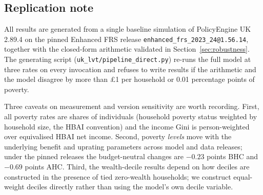 \subsection{Replication note}

All results are generated from a single baseline simulation of PolicyEngine UK 2.89.4 on the pinned Enhanced FRS release \texttt{enhanced\_frs\_2023\_24@1.56.14}, together with the closed-form arithmetic validated in Section~\ref{sec:robustness}. The generating script (\texttt{uk\_lvt/pipeline\_direct.py}) re-runs the full model at three rates on every invocation and refuses to write results if the arithmetic and the model disagree by more than \pounds 1 per household or 0.01 percentage points of poverty.

Three caveats on measurement and version sensitivity are worth recording. First, all poverty rates are shares of individuals (household poverty status weighted by household size, the HBAI convention) and the income Gini is person-weighted over equivalised HBAI net income. Second, poverty \emph{levels} move with the underlying benefit and uprating parameters across model and data releases; under the pinned releases the budget-neutral changes are $-0.23$ points BHC and $-0.69$ points AHC. Third, the wealth-decile results depend on how deciles are constructed in the presence of tied zero-wealth households; we construct equal-weight deciles directly rather than using the model's own decile variable.
